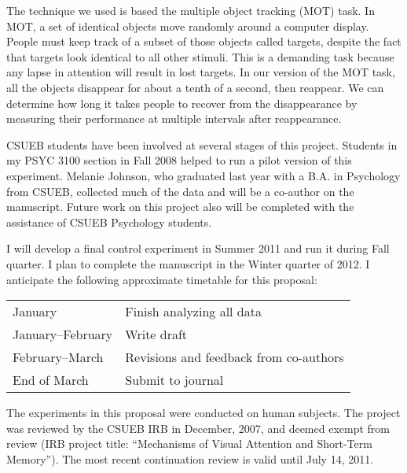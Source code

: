 \documentclass[12pt]{article}
\newcommand{\MySection}[2]{%
  \normalfont\normalsize\noindent{\bf#1.\hspace{1em}#2}}
\begin{document}
The technique we used is based the multiple object tracking (MOT) task.  In
MOT, a set of identical objects move randomly around a computer display.
People must keep track of a subset of those objects called targets, despite
the fact that targets look identical to all other stimuli.  This is a
demanding task because any lapse in attention will result in lost targets.
In our version of the MOT task, all the objects disappear for about a tenth
of a second, then reappear.  We can determine how long it takes people to
recover from the disappearance by measuring their performance at multiple
intervals after reappearance.

CSUEB students have been involved at several stages of this project.
Students in my PSYC 3100 section in Fall 2008 helped to run a pilot version
of this experiment.  Melanie Johnson, who graduated last year with a
B.A. in Psychology from CSUEB, collected much of the data and will be a
co-author on the manuscript.  Future work on this project also will be
completed with the assistance of CSUEB Psychology students.

\MySection{C}{Timetable}

I will develop a final control experiment in Summer 2011 and run it during
Fall quarter.  I plan to complete the manuscript in the Winter quarter of
2012.  I anticipate the following approximate timetable for this proposal:

\begin{center}
  \begin{singlespace}
    \begin{tabular}{ll}\hline
      January & Finish analyzing all data \\
      January--February & Write draft \\
      February--March & Revisions and feedback from co-authors \\
      End of March & Submit to journal \\\hline
    \end{tabular}
  \end{singlespace}
\end{center}

\MySection{D}{IRB Status}

The experiments in this proposal were conducted on human subjects.  The
project was reviewed by the CSUEB IRB in December, 2007, and deemed exempt
from review (IRB project title: ``Mechanisms of Visual Attention and
Short-Term Memory'').  The most recent continuation review is valid until
July 14, 2011.
\end{document}
